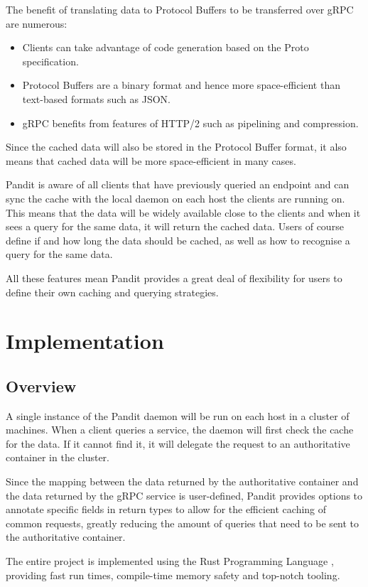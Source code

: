 \documentclass[12pt]{article}
\begin{document}
The benefit of translating data to Protocol Buffers to be transferred over gRPC are numerous:
\begin{itemize}
    \item Clients can take advantage of code generation based on the Proto specification. \cite{codegen}
    \item Protocol Buffers are a binary format and hence more space-efficient than text-based formats such as JSON. \cite{encoding}
    \item gRPC benefits from features of HTTP/2 such as pipelining and compression. \cite{http2}
\end{itemize}

Since the cached data will also be stored in the Protocol Buffer format, it also means that cached data will be more space-efficient in
many cases.

Pandit is aware of all clients that have previously queried an endpoint and can sync the cache with the local daemon on each host the
clients are running on.
This means that the data will be widely available close to the clients and when it sees a query for the same data, it will return the cached data.
Users of course define if and how long the data should be cached, as well as how to recognise a query for the same data.

All these features mean Pandit provides a great deal of flexibility for users to define their own caching and querying strategies.

\section{Implementation}
\subsection{Overview}
A single instance of the Pandit daemon will be run on each host in a cluster of machines. When a client queries
a service, the daemon will first check the cache for the data. If it cannot find it, it will delegate the request
to an authoritative container in the cluster.

Since the mapping between the data returned by the authoritative container and the data returned by the gRPC service is
user-defined, Pandit provides options to annotate specific fields in return types to allow for the efficient caching of
common requests, greatly reducing the amount of queries that need to be sent to the authoritative container.

The entire project is implemented using the Rust Programming Language \cite{rust}, providing fast run times, compile-time memory safety
and top-notch tooling.
\end{document}
